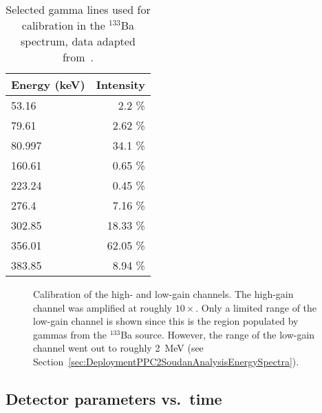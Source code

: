 				\begin{table}
					\centering
					\begin{tabular}{l r}
						\toprule
						Energy (keV) & Intensity \\
						\midrule
						    53.16 	 &     2.2 \% \\ 
						    79.61 	 &     2.62 \% \\
						    80.997 	 &    34.1 \%\\
						   160.61 	 &     0.65 \%\\
						   223.24 	 &   0.45 \% \\
						   276.4 	 &     7.16 \% \\
						   302.85 	 &   18.33 \% \\
						   356.01 	 &    62.05 \% \\
						   383.85 	  &    8.94 \% \\
						\bottomrule
					\end{tabular}
					\caption[Selected gamma lines used for calibration in the $^{133}$Ba spectrum]
					{Selected gamma lines used for calibration in the $^{133}$Ba spectrum, 
					data adapted from~\cite{Rab1995491}.}
					\label{tab:Ba133Peaks}
				\end{table}	
						
				\begin{figure}
					\centering
					\def\figwidth{0.76\textwidth}
					\caption[Calibration of the high- and low-gain channels]
					{Calibration of the high- and low-gain channels.  The high-gain channel was amplified at roughly $10\times$.  Only
					a limited range of the low-gain channel is shown since this is the region populated by gammas from the $^{133}$Ba source.  However,
					the range of the low-gain channel went out to roughly 2~MeV (see Section~\ref{sec:DeploymentPPC2SoudanAnalysisEnergySpectra}).}
					\label{fig:PPC2Calibration}
				\end{figure}

		\subsection{Detector parameters vs.~time}	
		\label{sec:PPC2DetParsVsTime}
		
